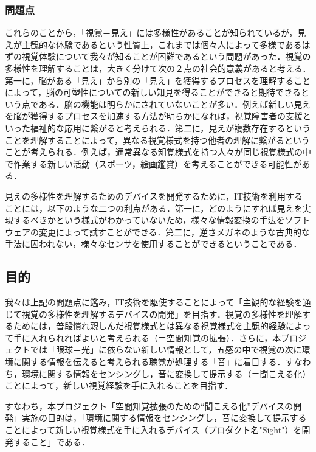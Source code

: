 \subsubsection{問題点}
これらのことから，「視覚＝見え」には多様性があることが知られているが，見えが主観的な体験であるという性質上，これまでは個々人によって多様であるはずの視覚体験について我々が知ることが困難であるという問題があった．視覚の多様性を理解することは，大きく分けて次の２点の社会的意義があると考える．第一に，脳がある「見え」から別の「見え」を獲得するプロセスを理解することによって，脳の可塑性についての新しい知見を得ることができると期待できるという点である．脳の機能は明らかにされていないことが多い．例えば新しい見えを脳が獲得するプロセスを加速する方法が明らかになれば，視覚障害者の支援といった福祉的な応用に繋がると考えられる．第二に，見えが複数存在するということを理解することによって，異なる視覚様式を持つ他者の理解に繋がるということが考えられる．例えば，通常異なる知覚様式を持つ人々が同じ視覚様式の中で作業する新しい活動（スポーツ，絵画鑑賞）を考えることができる可能性がある．

見えの多様性を理解するためのデバイスを開発するために，IT技術を利用することには，以下のような二つの利点がある．第一に，どのようにすれば見えを実現するべきかという様式がわかっていないため，様々な情報変換の手法をソフトウェアの変更によって試すことができる．第二に，逆さメガネのような古典的な手法に囚われない，様々なセンサを使用することができるということである．

\subsection{目的}
我々は上記の問題点に鑑み，IT技術を駆使することによって「主観的な経験を通じて視覚の多様性を理解するデバイスの開発」を目指す．視覚の多様性を理解するためには，普段慣れ親しんだ視覚様式とは異なる視覚様式を主観的経験によって手に入れられればよいと考えられる（＝空間知覚の拡張）．さらに，本プロジェクトでは「眼球＝光」に依らない新しい情報として，五感の中で視覚の次に環境に関する情報を伝えると考えられる聴覚が処理する「音」に着目する．すなわち，環境に関する情報をセンシングし，音に変換して提示する（＝聞こえる化）ことによって，新しい視覚経験を手に入れることを目指す．

すなわち，本プロジェクト「空間知覚拡張のための``聞こえる化''デバイスの開発」実施の目的は，「環境に関する情報をセンシングし，音に変換して提示することによって新しい視覚様式を手に入れるデバイス（プロダクト名"Sight"）を開発すること」である．












